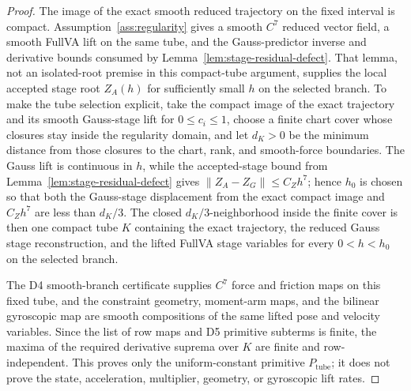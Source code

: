 \documentclass[preprint,12pt]{elsarticle}
\begin{document}
\begin{proof}
The image of the exact smooth reduced trajectory on the fixed interval is
compact.  Assumption~\ref{ass:regularity} gives a smooth \(C^7\) reduced
vector field, a smooth FullVA lift on the same tube, and the
Gauss-predictor inverse and derivative bounds consumed by
Lemma~\ref{lem:stage-residual-defect}.  That lemma, not an isolated-root
premise in this compact-tube argument, supplies the local accepted stage root
\(Z_A(h)\) for sufficiently small \(h\) on the selected branch.  To make the
tube selection explicit, take the compact image of the exact trajectory and
its smooth Gauss-stage lift for \(0\le c_i\le 1\), choose a finite chart cover
whose closures stay inside the regularity domain, and let \(d_K>0\) be the
minimum distance from those closures to the chart, rank, and smooth-force
boundaries.  The Gauss lift is continuous in \(h\), while the accepted-stage
bound from Lemma~\ref{lem:stage-residual-defect} gives
\(\|Z_A-Z_G\|\le C_Zh^7\); hence \(h_0\) is chosen so that both the
Gauss-stage displacement from the exact compact image and \(C_Zh^7\) are
less than \(d_K/3\).  The closed \(d_K/3\)-neighborhood inside the finite
cover is then one compact tube \(K\) containing the exact trajectory, the
reduced Gauss stage reconstruction, and the lifted FullVA stage variables for
every \(0<h<h_0\) on the selected branch.

The D4 smooth-branch certificate supplies \(C^7\) force and friction maps on
this fixed tube, and the constraint geometry, moment-arm maps, and the
bilinear gyroscopic map are smooth compositions of the same lifted pose and
velocity variables.  Since the list of row maps and D5 primitive subterms is
finite, the maxima of the required derivative suprema over \(K\) are finite
and row-independent.  This proves only the uniform-constant primitive
\(P_{\mathrm{tube}}\); it does not prove the state, acceleration,
multiplier, geometry, or gyroscopic lift rates.
\end{proof}
\end{document}
